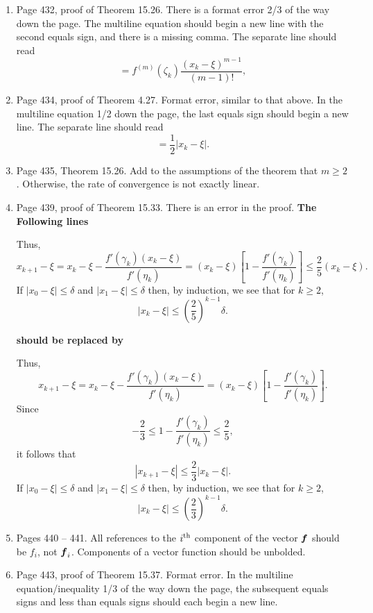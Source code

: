 \documentclass{book}
\begin{document}
	\begin{enumerate}
	\item
Page 432, proof of Theorem 15.26. There is a format error 2/3 of the way down the page. The multiline equation should begin a new line with the second equals sign, and there is a missing comma. The separate line should read
	\[
 = f^{(m)}(\zeta_k)\frac{(x_k-\xi)^{m-1}}{(m-1)!},
	\]
	
	\item
Page 434, proof of Theorem 4.27. Format error, similar to that above. In the multiline equation 1/2 down the page, the last equals sign should begin a new line. The separate line should read
	\[
= \frac{1}{2}|x_k-\xi|.	
	\]
	
	\item
Page 435, Theorem 15.26. Add to the assumptions of the theorem that $m\ge 2$. Otherwise, the rate of convergence is not exactly linear.

	\item
Page 439, proof of Theorem 15.33. There is an error in the proof. \textbf{The Following lines} 

	\medskip
	
Thus,
\[
  x_{k+1} -\xi = x_k - \xi -\frac{f'(\gamma_k) (x_k-\xi)}{f'(\eta_k)} = (x_k-\xi)\left[1 - \frac{f'(\gamma_k)}{f'(\eta_k)}\right] \le \frac{2}{5}(x_k-\xi).
\]
If $|x_0-\xi| \le \delta$ and $|x_1-\xi| \le \delta$ then, by induction, we see that for $k\ge 2$,
\[
  |x_k-\xi| \le \left( \frac{2}{5}\right)^{k-1} \delta .
\]

	\medskip

\textbf{should be replaced by}

	\medskip
	
Thus,
	\[
x_{k+1} -\xi = x_k - \xi -\frac{f'(\gamma_k) (x_k-\xi)}{f'(\eta_k)} = (x_k-\xi)\left[1 - \frac{f'(\gamma_k)}{f'(\eta_k)}\right] .
	\]
Since
	\[
-\frac{2}{3} \le 1 - \frac{f'(\gamma_k)}{f'(\eta_k)} \le \frac{2}{5} ,
	\]
it follows that
	\[
|x_{k+1} -\xi| \le \frac{2}{3} |x_k - \xi|.
	\]
If $|x_0-\xi| \le \delta$ and $|x_1-\xi| \le \delta$ then, by induction, we see that for $k\ge 2$,
	\[
|x_k-\xi| \le \left( \frac{2}{3}\right)^{k-1} \delta .
	\]

	\medskip
	
	
	\item
Pages 440 -- 441. All references to the $i^{\rm th}$ component of the vector $\boldsymbol{f}$ should be $f_i$, not $\boldsymbol{f}_i$. Components of a vector function should be unbolded.

	\item
Page 443, proof of Theorem 15.37. Format error. In the  multiline equation/inequality 1/3 of the way down the page, the subsequent equals signs and less than equals signs should each begin a new line. 


\end{enumerate}
\end{document}
